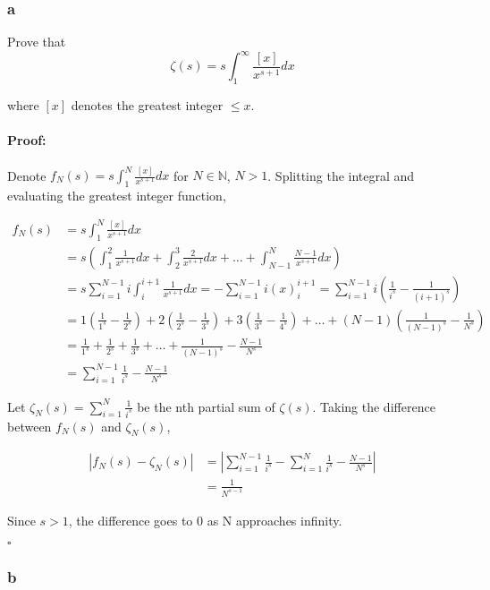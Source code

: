 \documentclass{article}
\newenvironment{proof}{\paragraph{Proof:}}{\hfill$\square$}
\begin{document}
\subsubsection*{a}

Prove that
\[
\zeta(s) = s\int_1^\infty \frac{[x]}{x^{s+1}}dx
\]

where $[x]$ denotes the greatest integer $\leq x$.

\begin{proof}
Denote $f_N(s) = s\int_1^N \frac{[x]}{x^{s+1}}dx$ for $N \in \mathbb{N}$, $N > 1$. Splitting the integral and evaluating the greatest integer function,

\begin{align*}
f_N(s) &= s\int_1^N \frac{[x]}{x^{s+1}}dx \\
&= s\left(
\int_1^2 \frac{1}{x^{s+1}}dx + \int_2^3 \frac{2}{x^{s+1}}dx + \dots + \int_{N-1}^N \frac{N-1}{x^{s+1}}dx
\right) \\
&= s \sum_{i=1}^{N-1} i \int_i^{i+1}\frac{1}{x^{s+1}} dx
= -\sum_{i=1}^{N-1} i (x)_i^{i+1} = \sum_{i=1}^{N-1} i\left(\frac{1}{i^s} - \frac{1}{(i+1)^s} \right) \\
&= 1\left(\frac{1}{1^s} - \frac{1}{2^s}\right) 
+ 2\left(\frac{1}{2^s} - \frac{1}{3^s}\right)
+ 3\left(\frac{1}{3^s} - \frac{1}{4^s}\right)
+ \dots + (N-1)\left( \frac{1}{(N-1)^s} - \frac{1}{N^s} \right) \\
&= \frac{1}{1^s} + \frac{1}{2^s} + \frac{1}{3^s} + \dots + \frac{1}{(N-1)^s} - \frac{N-1}{N^s} \\
&= \sum_{i=1}^{N-1} \frac{1}{i^s} - \frac{N-1}{N^s}
\end{align*}

Let $\zeta_N(s) = \sum_{i=1}^N \frac{1}{i^s}$ be the nth partial sum of $\zeta(s)$. Taking the difference between $f_N(s)$ and $\zeta_N(s)$,

\begin{align*}
|f_N(s) - \zeta_N(s)| &= \left| \sum_{i=1}^{N-1} \frac{1}{i^s} - \sum_{i=1}^N \frac{1}{i^s} - \frac{N-1}{N^s} \right| \\
&= \frac{1}{N^{s-1}}
\end{align*}

Since $s > 1$, the difference goes to 0 as N approaches infinity.

\end{proof}

\subsubsection*{b}
\end{document}
